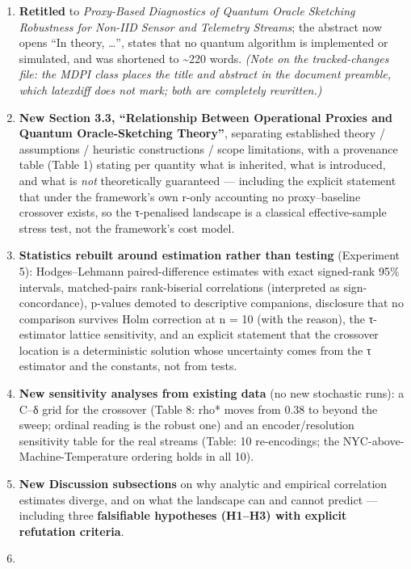 \documentclass[
  11pt,
]{article}
\providecommand{\tightlist}{%
  \setlength{\itemsep}{0pt}\setlength{\parskip}{0pt}}
\begin{document}
\begin{enumerate}
\def\labelenumi{\arabic{enumi}.}
\tightlist
\item
  \textbf{Retitled} to \emph{Proxy-Based Diagnostics of Quantum Oracle
  Sketching Robustness for Non-IID Sensor and Telemetry Streams}; the
  abstract now opens ``In theory, \ldots{}'', states that no quantum
  algorithm is implemented or simulated, and was shortened to
  \textasciitilde220 words. \emph{(Note on the tracked-changes file: the
  MDPI class places the title and abstract in the document preamble,
  which latexdiff does not mark; both are completely rewritten.)}
\item
  \textbf{New Section 3.3, ``Relationship Between Operational Proxies
  and Quantum Oracle-Sketching Theory''}, separating established theory
  / assumptions / heuristic constructions / scope limitations, with a
  provenance table (Table 1) stating per quantity what is inherited,
  what is introduced, and what is \emph{not} theoretically guaranteed
  --- including the explicit statement that under the framework's own
  r-only accounting no proxy--baseline crossover exists, so the
  τ-penalised landscape is a classical effective-sample stress test, not
  the framework's cost model.
\item
  \textbf{Statistics rebuilt around estimation rather than testing}
  (Experiment 5): Hodges--Lehmann paired-difference estimates with exact
  signed-rank 95\% intervals, matched-pairs rank-biserial correlations
  (interpreted as sign-concordance), p-values demoted to descriptive
  companions, disclosure that no comparison survives Holm correction at
  n = 10 (with the reason), the τ-estimator lattice sensitivity, and an
  explicit statement that the crossover location is a deterministic
  solution whose uncertainty comes from the τ estimator and the
  constants, not from tests.
\item
  \textbf{New sensitivity analyses from existing data} (no new
  stochastic runs): a C--δ grid for the crossover (Table 8: rho* moves
  from 0.38 to beyond the sweep; ordinal reading is the robust one) and
  an encoder/resolution sensitivity table for the real streams (Table:
  10 re-encodings; the NYC-above-Machine-Temperature ordering holds in
  all 10).
\item
  \textbf{New Discussion subsections} on why analytic and empirical
  correlation estimates diverge, and on what the landscape can and
  cannot predict --- including three \textbf{falsifiable hypotheses
  (H1--H3) with explicit refutation criteria}.
\item

\end{enumerate}
\end{document}
